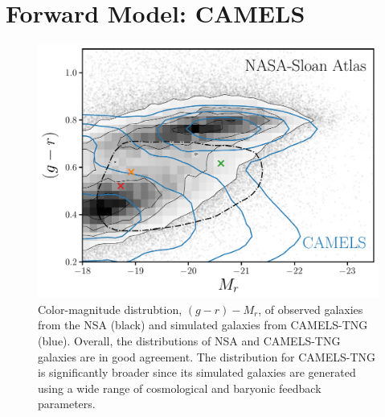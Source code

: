 \section{Forward Model: CAMELS} \label{sec:sims}
\begin{figure}[ht]
\begin{center}
    \centerline{\includegraphics[width=0.9\columnwidth]{figs/nsa.pdf}} 
    \vskip -0.1in
    \caption{Color-magnitude distrubtion, $(g-r) - M_r$, of observed galaxies
    from the NSA (black) and simulated galaxies from CAMELS-TNG (blue). 
    Overall, the distributions of NSA and CAMELS-TNG galaxies are in good
    agreement. 
    The distribution for CAMELS-TNG is significantly broader since its simulated
    galaxies are generated using a wide range of cosmological and baryonic
    feedback parameters.
    }\label{fig:nsa}
\end{center}
\vskip -0.3in
\end{figure}

